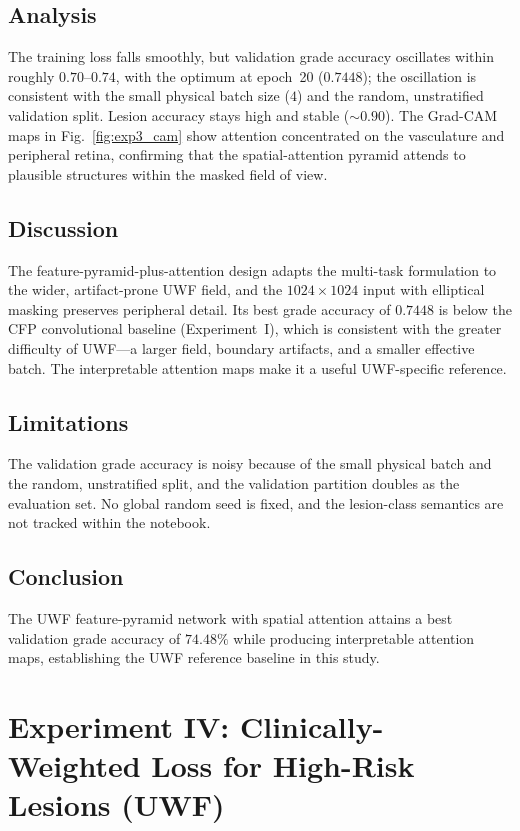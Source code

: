 \documentclass[journal,twoside,web]{ieeecolor}
\begin{document}
\subsection{Analysis}
The training loss falls smoothly, but validation grade accuracy oscillates within
roughly $0.70$--$0.74$, with the optimum at epoch~20 ($0.7448$); the oscillation
is consistent with the small physical batch size ($4$) and the random, unstratified
validation split. Lesion accuracy stays high and stable ($\sim0.90$). The Grad-CAM
maps in Fig.~\ref{fig:exp3_cam} show attention concentrated on the vasculature and
peripheral retina, confirming that the spatial-attention pyramid attends to
plausible structures within the masked field of view.

\subsection{Discussion}
The feature-pyramid-plus-attention design adapts the multi-task formulation to the
wider, artifact-prone UWF field, and the $1024\times1024$ input with elliptical
masking preserves peripheral detail. Its best grade accuracy of $0.7448$ is below
the CFP convolutional baseline (Experiment~I), which is consistent with the greater
difficulty of UWF---a larger field, boundary artifacts, and a smaller effective
batch. The interpretable attention maps make it a useful UWF-specific reference.

\subsection{Limitations}
The validation grade accuracy is noisy because of the small physical batch and the
random, unstratified split, and the validation partition doubles as the evaluation
set. No global random seed is fixed, and the lesion-class semantics are not tracked
within the notebook.

\subsection{Conclusion}
The UWF feature-pyramid network with spatial attention attains a best validation
grade accuracy of $74.48\%$ while producing interpretable attention maps,
establishing the UWF reference baseline in this study.

\section{Experiment IV: Clinically-Weighted Loss for High-Risk Lesions (UWF)}
\label{sec:exp4}
\end{document}
